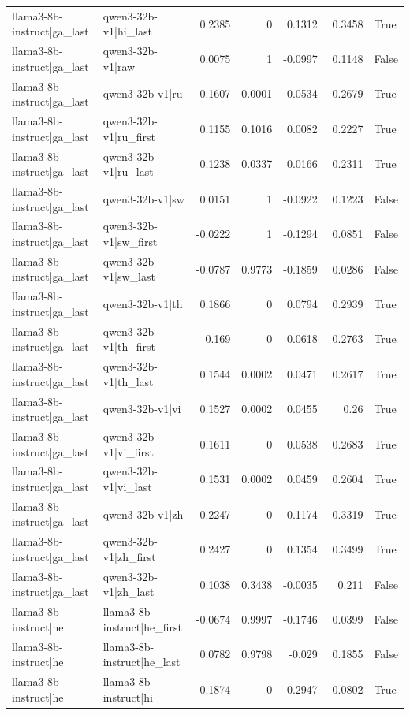 \begin{table}
\begin{tabular}{l l r r r r l}
llama3-8b-instruct|ga_last & qwen3-32b-v1|hi_last & 0.2385 & 0 & 0.1312 & 0.3458 & True \\
llama3-8b-instruct|ga_last & qwen3-32b-v1|raw & 0.0075 & 1 & -0.0997 & 0.1148 & False \\
llama3-8b-instruct|ga_last & qwen3-32b-v1|ru & 0.1607 & 0.0001 & 0.0534 & 0.2679 & True \\
llama3-8b-instruct|ga_last & qwen3-32b-v1|ru_first & 0.1155 & 0.1016 & 0.0082 & 0.2227 & True \\
llama3-8b-instruct|ga_last & qwen3-32b-v1|ru_last & 0.1238 & 0.0337 & 0.0166 & 0.2311 & True \\
llama3-8b-instruct|ga_last & qwen3-32b-v1|sw & 0.0151 & 1 & -0.0922 & 0.1223 & False \\
llama3-8b-instruct|ga_last & qwen3-32b-v1|sw_first & -0.0222 & 1 & -0.1294 & 0.0851 & False \\
llama3-8b-instruct|ga_last & qwen3-32b-v1|sw_last & -0.0787 & 0.9773 & -0.1859 & 0.0286 & False \\
llama3-8b-instruct|ga_last & qwen3-32b-v1|th & 0.1866 & 0 & 0.0794 & 0.2939 & True \\
llama3-8b-instruct|ga_last & qwen3-32b-v1|th_first & 0.169 & 0 & 0.0618 & 0.2763 & True \\
llama3-8b-instruct|ga_last & qwen3-32b-v1|th_last & 0.1544 & 0.0002 & 0.0471 & 0.2617 & True \\
llama3-8b-instruct|ga_last & qwen3-32b-v1|vi & 0.1527 & 0.0002 & 0.0455 & 0.26 & True \\
llama3-8b-instruct|ga_last & qwen3-32b-v1|vi_first & 0.1611 & 0 & 0.0538 & 0.2683 & True \\
llama3-8b-instruct|ga_last & qwen3-32b-v1|vi_last & 0.1531 & 0.0002 & 0.0459 & 0.2604 & True \\
llama3-8b-instruct|ga_last & qwen3-32b-v1|zh & 0.2247 & 0 & 0.1174 & 0.3319 & True \\
llama3-8b-instruct|ga_last & qwen3-32b-v1|zh_first & 0.2427 & 0 & 0.1354 & 0.3499 & True \\
llama3-8b-instruct|ga_last & qwen3-32b-v1|zh_last & 0.1038 & 0.3438 & -0.0035 & 0.211 & False \\
llama3-8b-instruct|he & llama3-8b-instruct|he_first & -0.0674 & 0.9997 & -0.1746 & 0.0399 & False \\
llama3-8b-instruct|he & llama3-8b-instruct|he_last & 0.0782 & 0.9798 & -0.029 & 0.1855 & False \\
llama3-8b-instruct|he & llama3-8b-instruct|hi & -0.1874 & 0 & -0.2947 & -0.0802 & True \\

\end{tabular}
\end{table}

